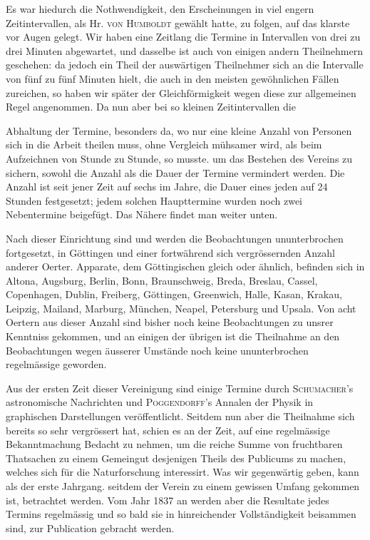 Es war hiedurch die Nothwendigkeit, den Erscheinungen in viel engern Zeitintervallen, als Hr. \textsc{von Humboldt} gewählt hatte, zu folgen, auf das klarste vor Augen gelegt. Wir haben eine Zeitlang die Termine in Intervallen von drei zu drei Minuten abgewartet, und dasselbe ist auch von einigen andern Theilnehmern geschehen: da jedoch ein Theil der auswärtigen Theilnehmer sich an die Intervalle von fünf zu fünf Minuten hielt, die auch in den meisten gewöhnlichen Fällen zureichen, so haben wir später der Gleichförmigkeit wegen diese zur allgemeinen Regel angenommen. Da nun aber bei so kleinen Zeitintervallen die
\par\clearpage
{}
\noindent Abhaltung der Termine, besonders da, wo nur eine kleine Anzahl von Personen sich in die Arbeit theilen muss, ohne Vergleich mühsamer wird, als beim Aufzeichnen von Stunde zu Stunde, so musste. um das Bestehen des Vereins zu sichern, sowohl die Anzahl als die Dauer der Termine vermindert werden. Die Anzahl ist seit jener Zeit auf sechs im Jahre, die Dauer eines jeden auf 24 Stunden festgesetzt; jedem solchen Haupttermine wurden noch zwei Nebentermine beigefügt. Das Nähere findet man weiter unten.

Nach dieser Einrichtung sind und werden die Beobachtungen ununterbrochen fortgesetzt, in Göttingen und einer fortwährend sich vergrössernden Anzahl anderer Oerter. Apparate, dem Göttingischen gleich oder ähnlich, befinden sich in Altona, Augsburg, Berlin, Bonn, Braunschweig, Breda, Breslau, Cassel, Copenhagen, Dublin, Freiberg, Göttingen, Greenwich, Halle, Kasan, Krakau, Leipzig, Mailand, Marburg, München, Neapel, Petersburg und Upsala. Von acht Oertern aus dieser Anzahl sind bisher noch keine Beobachtungen zu unsrer Kenntniss gekommen, und an einigen der übrigen ist die Theilnahme an den Beobachtungen wegen äusserer Umstände noch keine ununterbrochen regelmässige geworden.

Aus der ersten Zeit dieser Vereinigung sind einige Termine durch \textsc{Schumacher}'s astronomische Nachrichten und \textsc{Poggendorff}'s Annalen der Physik in graphischen Darstellungen veröffentlicht. Seitdem nun aber die Theilnahme sich bereits so sehr vergrössert hat, schien es an der Zeit, auf eine regelmässige Bekanntmachung Bedacht zu nehmen, um die reiche Summe von fruchtbaren Thatsachen zu einem Gemeingut desjenigen Theils des Publicums zu machen, welches sich für die Naturforschung interessirt. Was wir gegenwärtig geben, kann als der erste Jahrgang. seitdem der Verein zu einem gewissen Umfang gekommen ist, betrachtet werden. Vom Jahr 1837 an werden aber die Resultate jedes Termins regelmässig und so bald sie in hinreichender Vollständigkeit beisammen sind, zur Publication gebracht werden.

